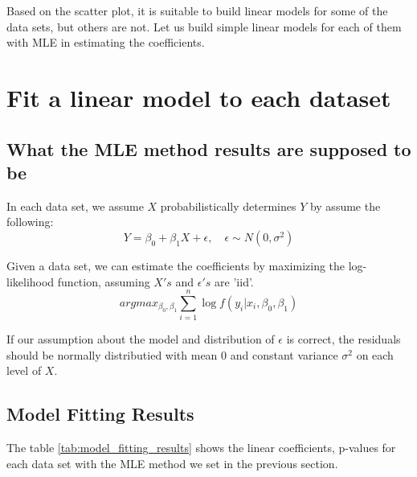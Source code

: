 \documentclass[12pt]{article}
\begin{document}
Based on the scatter plot, it is suitable to build linear models for some of the data sets, 
but others are not. Let us build simple linear models for each of them with MLE in estimating
the coefficients.

\section{Fit a linear model to each dataset}

\subsection{What the MLE method results are supposed to be}
In each data set, we assume \(X\) probabilistically determines \(Y\) by assume the following:
\[
Y = \beta_0 +\beta_1 X + \epsilon, \quad \epsilon \sim N(0, \sigma^2)
\]

Given a data set, we can estimate the coefficients by maximizing the log-likelihood function,
assuming \(X's\) and \(\epsilon's\) are 'iid'.
\[
argmax_{\beta_0, \beta_1} \sum_{i=1}^{n} \log f(y_i | x_i, \beta_0, \beta_1)
\]

If our assumption about the model and distribution of \(\epsilon\) is correct,
the residuals should be normally distributied with mean 0 and constant variance 
\(\sigma^2\) on each level of \(X\).

\subsection{Model Fitting Results}
The table \ref{tab:model_fitting_results} shows the linear coefficients, p-values for each data set with the MLE method we set in 
the previous section.
\end{document}
